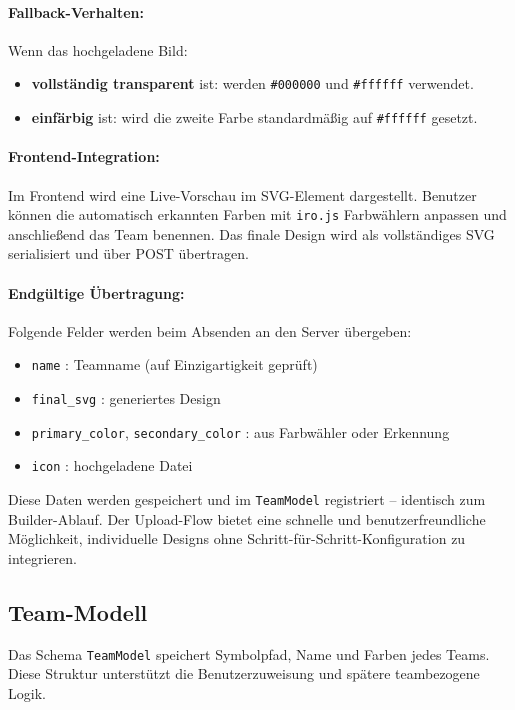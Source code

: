 \documentclass[12pt]{article}
\begin{document}
\paragraph{Fallback-Verhalten:}
Wenn das hochgeladene Bild:
\begin{itemize}
    \item \textbf{vollständig transparent} ist: werden \texttt{\#000000} und \texttt{\#ffffff} verwendet.
    \item \textbf{einfärbig} ist: wird die zweite Farbe standardmäßig auf \texttt{\#ffffff} gesetzt.
\end{itemize}

\paragraph{Frontend-Integration:}
Im Frontend wird eine Live-Vorschau im SVG-Element dargestellt. Benutzer können die automatisch erkannten Farben mit \texttt{iro.js} Farbwählern anpassen und anschließend das Team benennen. Das finale Design wird als vollständiges SVG serialisiert und über POST übertragen.

\paragraph{Endgültige Übertragung:}
Folgende Felder werden beim Absenden an den Server übergeben:

\begin{itemize}
    \item \texttt{name} : Teamname (auf Einzigartigkeit geprüft)
    \item \texttt{final\_svg} : generiertes Design
    \item \texttt{primary\_color}, \texttt{secondary\_color} : aus Farbwähler oder Erkennung
    \item \texttt{icon} : hochgeladene Datei
\end{itemize}

\noindent Diese Daten werden gespeichert und im \texttt{TeamModel} registriert – identisch zum Builder-Ablauf. Der Upload-Flow bietet eine schnelle und benutzerfreundliche Möglichkeit, individuelle Designs ohne Schritt-für-Schritt-Konfiguration zu integrieren.

\subsection{Team-Modell}

Das Schema \texttt{TeamModel} speichert Symbolpfad, Name und Farben jedes Teams. Diese Struktur unterstützt die Benutzerzuweisung und spätere teambezogene Logik.
\end{document}
